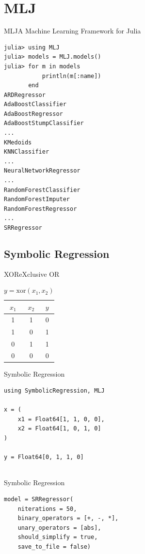 \documentclass[11pt]{beamer}
\begin{document}
\section{MLJ}
\begin{frame}[fragile]{MLJ}{A Machine Learning Framework for Julia}
\begin{lstlisting}[basicstyle=\tiny]
julia> using MLJ
julia> models = MLJ.models()
julia> for m in models
           println(m[:name])
       end
ARDRegressor
AdaBoostClassifier
AdaBoostRegressor
AdaBoostStumpClassifier
...
KMedoids
KNNClassifier
...
NeuralNetworkRegressor
...
RandomForestClassifier
RandomForestImputer
RandomForestRegressor
...
SRRegressor
\end{lstlisting}
\end{frame}

\subsection{Symbolic Regression}
\begin{frame}[fragile]{XOR}{eXclusive OR}
\begin{table}
\centering
\begin{tabular}{|c|c|c|}
	\hline
	$x_1$ & $x_2$ & $y$ \\
	\hline 
	1 & 1 & 0 \\
	\hline 
	1 & 0 & 1 \\
	\hline 
	0 & 1 & 1 \\
	\hline 
	0 & 0 & 0 \\
	\hline 
\end{tabular}
\caption{$y = \text{xor}(x_1, x_2)$}
\end{table}
\end{frame}

\begin{frame}[fragile]{Symbolic Regression}
\begin{lstlisting}
using SymbolicRegression, MLJ

x = (
	x1 = Float64[1, 1, 0, 0], 
	x2 = Float64[1, 0, 1, 0]
)
		
y = Float64[0, 1, 1, 0]
		
\end{lstlisting}
\end{frame}


\begin{frame}[fragile]{Symbolic Regression}
	\begin{lstlisting}
model = SRRegressor(
	niterations = 50,
	binary_operators = [+, -, *],
	unary_operators = [abs],
	should_simplify = true,
	save_to_file = false)

\end{lstlisting}
\end{frame}
\end{document}
